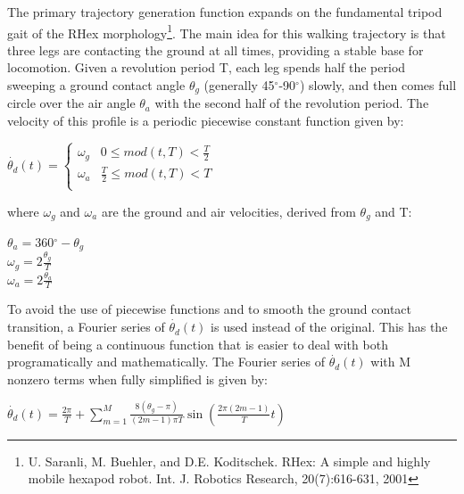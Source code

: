 \documentclass[11pt]{article}
\begin{document}
The primary trajectory generation function expands on the fundamental tripod gait of the RHex morphology\footnote{U. Saranli, M. Buehler, and D.E. Koditschek. RHex: A simple and highly mobile hexapod robot. Int. J. Robotics Research, 20(7):616-631, 
2001}. The main idea for this walking trajectory is that three legs are contacting the ground at all times, providing a stable base for locomotion. Given a revolution period T, each leg spends half the period sweeping a ground contact angle \(\theta _g\) (generally 45${}^{\circ}$-90${}^{\circ}$) slowly, and then comes full circle over the air angle \(\theta _a\) with the second half of the revolution period. The velocity of this profile is a periodic piecewise constant function given by:

\begin{center}
\(\dot{\theta _d}(t)=\left\{
\begin{array}{cc}
 \omega _g & 0\leq mod(t, T) <\frac{T}{2} \\
 \omega _a & \frac{T}{2}\leq mod(t, T) <T \\
\end{array}
\right.\)
\end{center}

where \(\omega _g\) and \(\omega _a\) are the ground and air velocities, derived from \(\theta _g\) and T:

\begin{center}
\(\theta _a=360{}^{\circ}-\theta _g\)\\
\(\omega _g=2\frac{\theta _g}{T}\)\\
\(\omega _a=2\frac{\theta _a}{T}\)
\end{center}

To avoid the use of piecewise functions and to smooth the ground contact transition, a Fourier series of \(\dot{\theta _d}(t)\) is used instead of
the original. This has the benefit of being a continuous function that is easier to deal with both programatically and mathematically. The Fourier series of \(\dot{\theta _d}(t)\) with M nonzero terms when fully simplified is given by:

\begin{center}
\(\dot{\theta _d}(t)=\frac{2 \pi }{T}+\sum _{m=1}^M \frac{8\left(\theta _g-\pi \right)}{(2m-1)\pi  T}\sin \left(\frac{2\pi  (2m-1)}{T}t\right)\)
\end{center}
\end{document}
